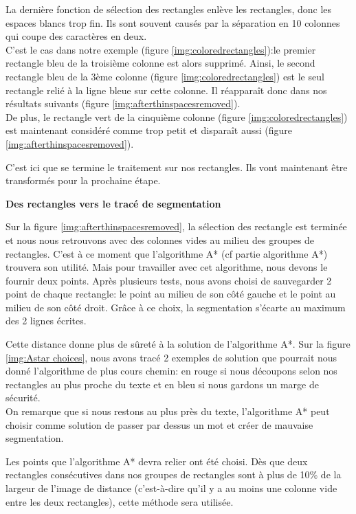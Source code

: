\documentclass[12pt,a4paper]{article}
\begin{document}
La dernière fonction de sélection des rectangles enlève les rectangles, donc les espaces blancs trop fin. Ils sont souvent causés par la séparation en 10 colonnes qui coupe des caractères en deux.\\
C'est le cas dans notre exemple (figure \ref{img:coloredrectangles}):le premier rectangle bleu de la troisième colonne est alors supprimé. Ainsi, le second rectangle bleu de la 3ème colonne (figure \ref{img:coloredrectangles}) est le seul rectangle relié à la ligne bleue sur cette colonne. Il réapparaît donc dans nos résultats suivants (figure \ref{img:afterthinspacesremoved}).\\
De plus, le rectangle vert de la cinquième colonne (figure \ref{img:coloredrectangles}) est maintenant considéré comme trop petit et disparaît aussi (figure \ref{img:afterthinspacesremoved}).




C'est ici que se termine le traitement sur nos rectangles. Ils vont maintenant être transformés pour la prochaine étape.\bigbreak

\bigbreak\textbf{Des rectangles vers le tracé de segmentation}\bigbreak

Sur la figure \ref{img:afterthinspacesremoved}, la sélection des rectangle est terminée et nous nous retrouvons avec des colonnes vides au milieu des groupes de rectangles.\bigbreak
C'est à ce moment que l'algorithme A* (cf partie algorithme A*) trouvera son utilité. Mais pour travailler avec cet algorithme, nous devons le fournir deux points. Après plusieurs tests, nous avons choisi de sauvegarder 2 point de chaque rectangle: le point au milieu de son côté gauche et le point au milieu de son côté droit. Grâce à ce choix, la segmentation s'écarte au maximum des 2 lignes écrites.\bigbreak



Cette distance donne plus de sûreté à la solution de l'algorithme A*. Sur la figure \ref{img:Astar choices}, nous avons tracé 2 exemples de solution que pourrait nous donné l'algorithme de plus cours chemin: en rouge si nous découpons selon nos rectangles au plus proche du texte et en bleu si nous gardons un marge de sécurité.\\
On remarque que si nous restons au plus près du texte, l'algorithme A* peut choisir comme solution de passer par dessus un mot et créer de mauvaise segmentation.\bigbreak



Les points que l'algorithme A* devra relier ont été choisi. Dès que deux rectangles consécutives dans nos groupes de rectangles sont à plus de 10\% de la largeur de l'image de distance (c'est-à-dire qu'il y a au moins une colonne vide entre les deux rectangles), cette méthode sera utilisée.\bigbreak
\end{document}
